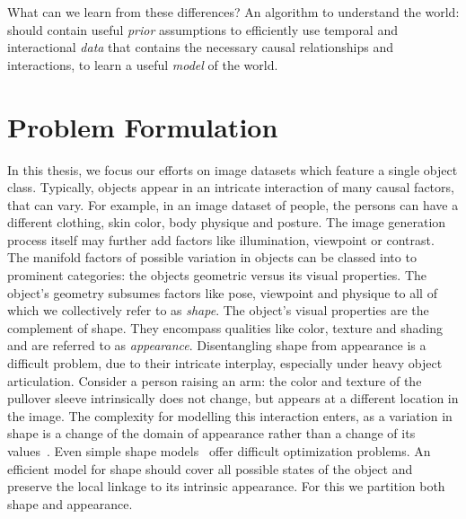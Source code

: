 	What can we learn from these differences? An algorithm to understand the world: should contain useful \textit{prior} assumptions to efficiently use temporal and interactional \textit{data} that contains the necessary causal relationships and interactions, to learn a useful \textit{model} of the world.

%

\section{Problem Formulation}

	In this thesis, we focus our efforts on image datasets which feature a single object class.
	Typically, objects appear in an intricate interaction of many causal factors, that can vary.
	For example, in an image dataset of people, the persons can have a different clothing, skin color, body physique and posture.
	The image generation process itself may further add factors like illumination, viewpoint or contrast.
	The manifold factors of possible variation in objects can be classed into to prominent categories: the objects geometric versus its visual properties.
	The object's geometry subsumes factors like pose, viewpoint and physique to all of which we collectively refer to as \textit{shape}. The object's visual properties are the complement of shape. They encompass qualities like color, texture and shading and are referred to as \textit{appearance}.
	Disentangling shape from appearance is a difficult problem, due to their intricate interplay, especially under heavy object articulation.
	Consider a person raising an arm: the color and texture of the pullover sleeve intrinsically does not change, but appears at a different location in the image.
	The complexity for modelling this interaction enters, as a variation in shape is a change of the domain of appearance rather than a change of its values~\cite{shu18shapeappear}.
	Even simple shape models~\cite{cootes98activeappear} offer difficult optimization problems.
	An efficient model for shape should cover all possible states of the object and preserve the local linkage to its intrinsic appearance. For this we partition both shape and appearance.


